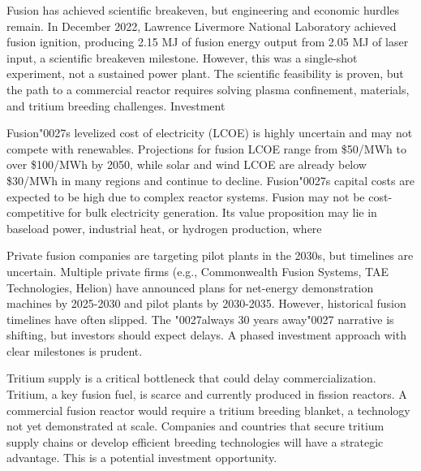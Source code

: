 \documentclass[10pt,a4paper]{article}
\newcommand{\BOApos}{{\BOQuoteFont\char"0027}}
\begin{document}
\begin{minipage}[t]{0.46\linewidth}
{\small Fusion has achieved scientific breakeven, but engineering and economic hurdles remain. In December 2022, Lawrence Livermore National Laboratory achieved fusion ignition, producing 2.15 MJ of fusion energy output from 2.05 MJ of laser input, a scientific breakeven milestone. However, this was a single-shot experiment, not a sustained power plant. The scientific feasibility is proven, but the path to a commercial reactor requires solving plasma confinement, materials, and tritium breeding challenges. Investment}\par
{\small Fusion\BOApos{}s levelized cost of electricity (LCOE) is highly uncertain and may not compete with renewables. Projections for fusion LCOE range from \$50/MWh to over \$100/MWh by 2050, while solar and wind LCOE are already below \$30/MWh in many regions and continue to decline. Fusion\BOApos{}s capital costs are expected to be high due to complex reactor systems. Fusion may not be cost-competitive for bulk electricity generation. Its value proposition may lie in baseload power, industrial heat, or hydrogen production, where}\par
\end{minipage}\hfill\begin{minipage}[t]{0.46\linewidth}
{\small Private fusion companies are targeting pilot plants in the 2030s, but timelines are uncertain. Multiple private firms (e.g., Commonwealth Fusion Systems, TAE Technologies, Helion) have announced plans for net-energy demonstration machines by 2025-2030 and pilot plants by 2030-2035. However, historical fusion timelines have often slipped. The \BOApos{}always 30 years away\BOApos{} narrative is shifting, but investors should expect delays. A phased investment approach with clear milestones is prudent.}\par
{\small Tritium supply is a critical bottleneck that could delay commercialization. Tritium, a key fusion fuel, is scarce and currently produced in fission reactors. A commercial fusion reactor would require a tritium breeding blanket, a technology not yet demonstrated at scale. Companies and countries that secure tritium supply chains or develop efficient breeding technologies will have a strategic advantage. This is a potential investment opportunity.}\par
\end{minipage}
\end{document}

